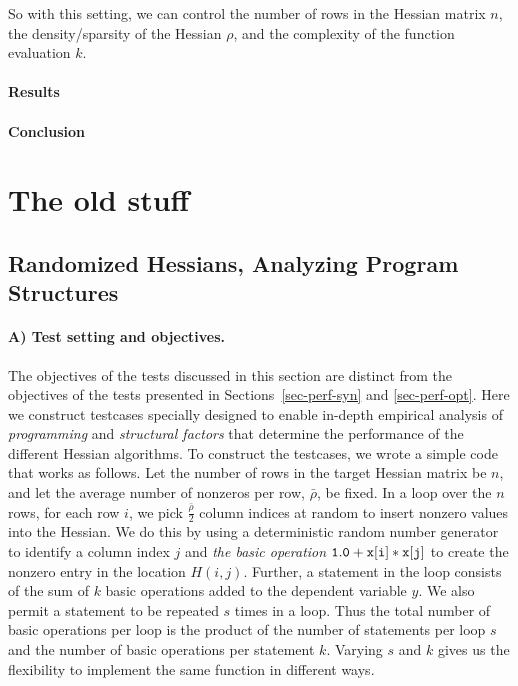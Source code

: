 \documentclass[12pt]{article}
\begin{document}
So with this setting, we can control the number of rows in the Hessian matrix $n$, the density/sparsity of the Hessian $\rho$, and the complexity of the function evaluation $k$.

\paragraph{Results}
\paragraph{Conclusion}

\newpage

\appendix
\section{The old stuff}
\subsection{Randomized Hessians, Analyzing Program Structures}
\label{sec-perf-rand}

\label{sec-perf-random}

\paragraph{A) Test setting and objectives.}
The objectives of the tests discussed in this section are distinct from
the objectives of the tests presented in Sections~\ref{sec-perf-syn} and \ref{sec-perf-opt}.
Here we construct testcases specially designed to enable in-depth
empirical analysis of {\em programming} and {\em structural factors} that 
determine the performance of the  different Hessian algorithms. 
To construct the testcases, we wrote a simple code that works as follows. 
Let the number of rows in the target Hessian matrix be $n$, and
let the average number of nonzeros per row, $\bar{\rho}$, be fixed.
In a loop over the $n$ rows, for each row $i$, 
we pick $\frac{\bar{\rho}}{2}$ column indices at random to insert nonzero values into the Hessian.    
We do this by using a deterministic random number generator to identify a column index $j$ and {\em the basic operation} 
$\tt 1.0+x[i]*x[j]$ to create the nonzero entry in the location $H(i,j)$. 
Further, a statement in the loop consists of the sum of $k$ basic operations added to the dependent variable $y$. We also permit a statement to be repeated $s$ times in a loop. Thus the total number of basic operations per loop is the product of the number of statements per loop $s$ and the number of basic operations per statement $k$. Varying $s$ and $k$ gives us the flexibility to implement the same function in different ways.
\end{document}
